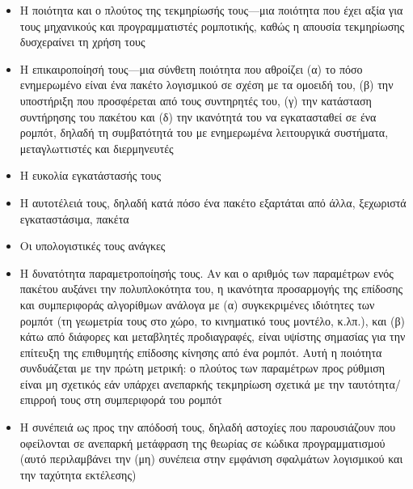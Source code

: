 \begin{itemize}
  \item Η ποιότητα και ο πλούτος της τεκμηρίωσής τους---μια ποιότητα που έχει
        αξία για τους μηχανικούς και προγραμματιστές ρομποτικής, καθώς η απουσία
        τεκμηρίωσης δυσχεραίνει τη χρήση τους
  \item Η επικαιροποίησή τους---μια σύνθετη ποιότητα που αθροίζει (α) το πόσο
        ενημερωμένο είναι ένα πακέτο λογισμικού σε σχέση με τα ομοειδή του, (β)
        την υποστήριξη που προσφέρεται από τους συντηρητές του, (γ) την
        κατάσταση συντήρησης του πακέτου και (δ) την ικανότητά του
        να εγκατασταθεί σε ένα ρομπότ, δηλαδή τη συμβατότητά του με
        ενημερωμένα λειτουργικά συστήματα, μεταγλωττιστές και διερμηνευτές
  \item Η ευκολία εγκατάστασής τους
  \item Η αυτοτέλειά τους, δηλαδή κατά πόσο ένα πακέτο εξαρτάται από άλλα,
        ξεχωριστά εγκαταστάσιμα, πακέτα
  \item Οι υπολογιστικές τους ανάγκες
  \item Η δυνατότητα παραμετροποίησής τους. Αν και ο αριθμός των παραμέτρων ενός
        πακέτου αυξάνει την πολυπλοκότητα του, η ικανότητα προσαρμογής της
        επίδοσης και συμπεριφοράς αλγορίθμων ανάλογα με (α) συγκεκριμένες
        ιδιότητες των ρομπότ (τη γεωμετρία τους στο χώρο, το κινηματικό τους
        μοντέλο, κ.λπ.), και (β) κάτω από διάφορες και μεταβλητές
        προδιαγραφές, είναι υψίστης σημασίας για την επίτευξη της επιθυμητής
        επίδοσης κίνησης από ένα ρομπότ. Αυτή η ποιότητα συνδυάζεται με την
        πρώτη μετρική: ο πλούτος των παραμέτρων προς ρύθμιση είναι μη σχετικός
        εάν υπάρχει ανεπαρκής τεκμηρίωση σχετικά με την ταυτότητα/επιρροή τους
        στη συμπεριφορά του ρομπότ
  \item Η συνέπειά ως προς την απόδοσή τους, δηλαδή αστοχίες που παρουσιάζουν
        που οφείλονται σε ανεπαρκή μετάφραση της θεωρίας σε κώδικα
        προγραμματισμού (αυτό περιλαμβάνει την (μη) συνέπεια στην εμφάνιση
        σφαλμάτων λογισμικού και την ταχύτητα εκτέλεσης)
\end{itemize}

